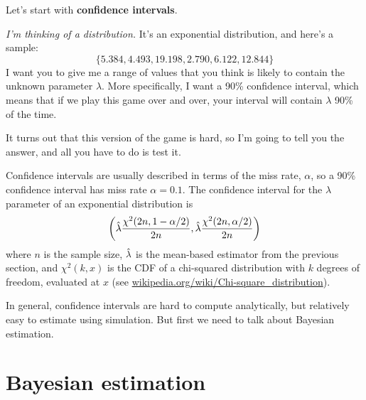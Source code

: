 \documentclass[12pt]{book}
\begin{document}
Let's start with {\bf confidence intervals}.

{\em I'm thinking of a distribution.}  It's an exponential distribution, and 
here's a sample:
%
\[ \{ 5.384, 4.493, 19.198, 2.790, 6.122, 12.844 \} \]
%
I want you to give me a range of values that you think is likely to
contain the unknown parameter $\lambda$.  More specifically, I want
a 90\% confidence interval, which means that if we play this game over
and over, your interval will contain $\lambda$ 90\% of the time.

It turns out that this version of the game is hard, so I'm going
to tell you the answer, and all you have to do is test it.

Confidence intervals are usually described in terms of the miss rate,
$\alpha$, so a 90\% confidence interval has miss rate $\alpha = 0.1$.
The confidence interval for the $\lambda$ parameter of an exponential
distribution is
%
\[ \left( \hat{\lambda} \frac{\chi^2(2n, 1-\alpha/2)}{2n},
      \hat{\lambda} \frac{\chi^2(2n, \alpha/2)}{2n} \right) \]
%
where $n$ is the sample size, $\hat{\lambda}$ is the mean-based estimator
from the previous section, and $\chi^2(k, x)$ is the CDF of a
chi-squared distribution with $k$ degrees of freedom, evaluated at $x$
(see \url{wikipedia.org/wiki/Chi-square_distribution}).

In general, confidence intervals are hard to compute analytically, but
relatively easy to estimate using simulation.  But first we need
to talk about Bayesian estimation.








\section{Bayesian estimation}
\end{document}

